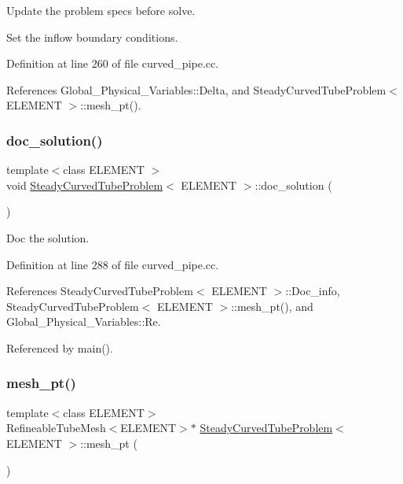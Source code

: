 Update the problem specs before solve. 

Set the inflow boundary conditions. 

Definition at line 260 of file curved\+\_\+pipe.\+cc.



References Global\+\_\+\+Physical\+\_\+\+Variables\+::\+Delta, and Steady\+Curved\+Tube\+Problem$<$ E\+L\+E\+M\+E\+N\+T $>$\+::mesh\+\_\+pt().

\mbox{\label{classSteadyCurvedTubeProblem_a544bdf06e254393094a39561944af6b7}} 
\subsubsection{\texorpdfstring{doc\+\_\+solution()}{doc\_solution()}}
{\footnotesize\ttfamily template$<$class E\+L\+E\+M\+E\+NT $>$ \\
void \hyperlink{classSteadyCurvedTubeProblem}{Steady\+Curved\+Tube\+Problem}$<$ E\+L\+E\+M\+E\+NT $>$\+::doc\+\_\+solution (\begin{DoxyParamCaption}{ }\end{DoxyParamCaption})}



Doc the solution. 



Definition at line 288 of file curved\+\_\+pipe.\+cc.



References Steady\+Curved\+Tube\+Problem$<$ E\+L\+E\+M\+E\+N\+T $>$\+::\+Doc\+\_\+info, Steady\+Curved\+Tube\+Problem$<$ E\+L\+E\+M\+E\+N\+T $>$\+::mesh\+\_\+pt(), and Global\+\_\+\+Physical\+\_\+\+Variables\+::\+Re.



Referenced by main().

\mbox{\label{classSteadyCurvedTubeProblem_ae31d15be72aabd7fe088499edd715d09}} 
\subsubsection{\texorpdfstring{mesh\+\_\+pt()}{mesh\_pt()}}
{\footnotesize\ttfamily template$<$class E\+L\+E\+M\+E\+NT$>$ \\
Refineable\+Tube\+Mesh$<$E\+L\+E\+M\+E\+NT$>$$\ast$ \hyperlink{classSteadyCurvedTubeProblem}{Steady\+Curved\+Tube\+Problem}$<$ E\+L\+E\+M\+E\+NT $>$\+::mesh\+\_\+pt (\begin{DoxyParamCaption}{ }\end{DoxyParamCaption})\hspace{0.3cm}{\ttfamily [inline]}}



